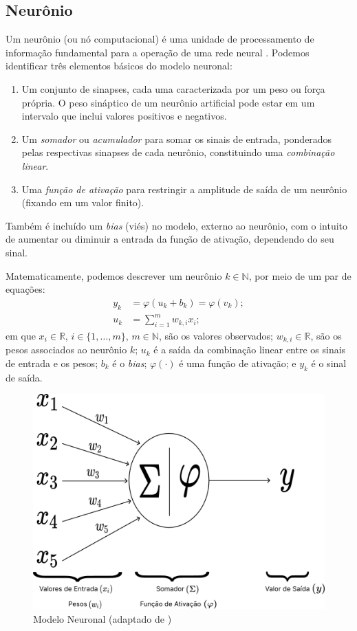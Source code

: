 \documentclass{automatextcc}
\newcommand{\R}{\mathds{R}}
\newcommand{\N}{\mathds{N}}
\begin{document}
\subsection{Neurônio}
Um neurônio (ou nó computacional) é uma unidade de processamento de informação fundamental para a operação de uma rede neural \citep{haykin2008}. Podemos identificar três elementos básicos do modelo neuronal:
\begin{enumerate}
    \item Um conjunto de sinapses, cada uma caracterizada por um peso ou força própria. O peso sináptico de um neurônio artificial pode estar em um intervalo que inclui valores positivos e negativos.
    \item Um \textit{somador} ou \textit{acumulador} para somar os sinais de entrada, ponderados pelas respectivas sinapses de cada neurônio, constituindo uma \textit{combinação linear}.
    \item Uma \textit{função de ativação} para restringir a amplitude de saída de um neurônio (fixando em um valor finito).
\end{enumerate}
Também é incluído um \textit{bias} (viés) no modelo, externo ao neurônio, com o intuito de aumentar ou diminuir a entrada da função de ativação, dependendo do seu sinal.

Matematicamente, podemos descrever um neurônio $k \in \N$, por meio de um par de equações:
\begin{align*}
    y_k &= \varphi(u_k + b_k) = \varphi(v_k);\\[.2cm]
    u_k &= \displaystyle{\sum_{i=1}^{m} }w_{k,i}x_i;
\end{align*}
em que $x_i \in \R$, $i \in \{1,\dots,m\}$, $m \in \N$, são os valores observados; $w_{k,i} \in \R$, são os pesos associados ao neurônio $k$; $u_k$ é a saída da combinação linear entre os sinais de entrada e os pesos; $b_k$ é o \textit{bias}; $\varphi(\cdot)$ é uma função de ativação; e $y_k$ é o sinal de saída.

\begin{figure}
    \centering
    \includegraphics[width=.7\textwidth]{figuras/neuron_model.pdf}
	\caption{Modelo Neuronal (adaptado de \citet{haykin2001,hair2005})}
\end{figure}
\end{document}
